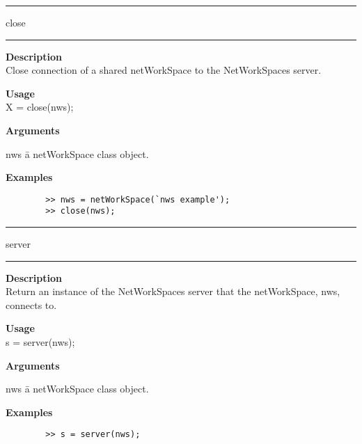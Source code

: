 \rule[0.06in]{6in}{0.01in}
\newline
close
\newline
\rule{6in}{0.01in}
\begin{list}{}{}
	\item {\bf Description}\\
	Close connection of a shared netWorkSpace to the NetWorkSpaces server. 
	\item {\bf Usage}\\
	X = close(nws);
	\item {\bf Arguments}
		\begin{tabbing}
		nws \hspace{2.5cm} \= a netWorkSpace class object.
		\end{tabbing}
	\item {\bf Examples}
		\begin{verbatim}
		>> nws = netWorkSpace(`nws example');
		>> close(nws);
		\end{verbatim}
\end{list}

\rule[0.06in]{6in}{0.01in}
\newline
server
\newline
\rule{6in}{0.01in}
\begin{list}{}{}
	\item {\bf Description}\\
	Return an instance of the NetWorkSpaces server that the netWorkSpace, nws, connects to.
	\item {\bf Usage}\\
	s = server(nws);
	\item {\bf Arguments}
		\begin{tabbing}
		nws \hspace{2.5cm} \= a netWorkSpace class object.
		\end{tabbing}
	\item {\bf Examples}
		\begin{verbatim}
		>> s = server(nws);
		\end{verbatim}
\end{list}


